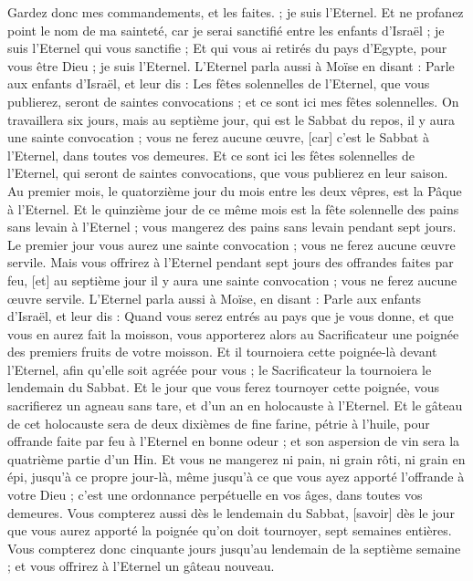 \begin{multicols}{2}
Gardez donc mes commandements, et les faites. ; je suis l'Eternel.
Et ne profanez point le nom de ma sainteté, car je serai sanctifié entre les enfants d'Israël ; je suis l'Eternel qui vous sanctifie ;
Et qui vous ai retirés du pays d'Egypte, pour vous être Dieu ; je suis l'Eternel.
\VerseOne{}L'Eternel parla aussi à Moïse en disant :
Parle aux enfants d'Israël, et leur dis : Les fêtes solennelles de l'Eternel, que vous publierez, seront de saintes convocations ; et ce sont ici mes fêtes solennelles.
On travaillera six jours, mais au septième jour, qui est le Sabbat du repos, il y aura une sainte convocation ; vous ne ferez aucune œuvre, [car] c'est le Sabbat à l'Eternel, dans toutes vos demeures.
Et ce sont ici les fêtes solennelles de l'Eternel, qui seront de saintes convocations, que vous publierez en leur saison.
Au premier mois, le quatorzième jour du mois entre les deux vêpres, est la Pâque à l'Eternel.
Et le quinzième jour de ce même mois est la fête solennelle des pains sans levain à l'Eternel ; vous mangerez des pains sans levain pendant sept jours.
Le premier jour vous aurez une sainte convocation ; vous ne ferez aucune œuvre servile.
Mais vous offrirez à l'Eternel pendant sept jours des offrandes faites par feu, [et] au septième jour il y aura une sainte convocation ; vous ne ferez aucune œuvre servile.
L'Eternel parla aussi à Moïse, en disant :
Parle aux enfants d'Israël, et leur dis : Quand vous serez entrés au pays que je vous donne, et que vous en aurez fait la moisson, vous apporterez alors au Sacrificateur une poignée des premiers fruits de votre moisson.
Et il tournoiera cette poignée-là devant l'Eternel, afin qu'elle soit agréée pour vous ; le Sacrificateur la tournoiera le lendemain du Sabbat.
Et le jour que vous ferez tournoyer cette poignée, vous sacrifierez un agneau sans tare, et d'un an en holocauste à l'Eternel.
Et le gâteau de cet holocauste sera de deux dixièmes de fine farine, pétrie à l'huile, pour offrande faite par feu à l'Eternel en bonne odeur ; et son aspersion de vin sera la quatrième partie d'un Hin.
Et vous ne mangerez ni pain, ni grain rôti, ni grain en épi, jusqu'à ce propre jour-là, même jusqu'à ce que vous ayez apporté l'offrande à votre Dieu ; c'est une ordonnance perpétuelle en vos âges, dans toutes vos demeures.
Vous compterez aussi dès le lendemain du Sabbat, [savoir] dès le jour que vous aurez apporté la poignée qu'on doit tournoyer, sept semaines entières.
Vous compterez donc cinquante jours jusqu'au lendemain de la septième semaine ; et vous offrirez à l'Eternel un gâteau nouveau.

\end{multicols}
